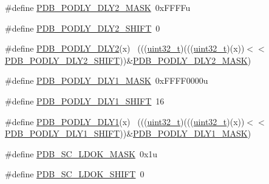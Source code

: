 \begin{DoxyCompactItemize}
\item 
\#define \hyperlink{group___p_d_b___register___masks_ga1b7c6a0b290ea82908b74e7b8c2f4009}{P\+D\+B\+\_\+\+P\+O\+D\+L\+Y\+\_\+\+D\+L\+Y2\+\_\+\+M\+A\+SK}~0x\+F\+F\+F\+Fu
\item 
\#define \hyperlink{group___p_d_b___register___masks_gaa576ed647be6411616c3f6e6d03ab47c}{P\+D\+B\+\_\+\+P\+O\+D\+L\+Y\+\_\+\+D\+L\+Y2\+\_\+\+S\+H\+I\+FT}~0
\item 
\#define \hyperlink{group___p_d_b___register___masks_gacb978b29977f07b658a43d8591505f74}{P\+D\+B\+\_\+\+P\+O\+D\+L\+Y\+\_\+\+D\+L\+Y2}(x)                                            ~(((\hyperlink{_p_e___types_8h_a33594304e786b158f3fb30289278f5af}{uint32\+\_\+t})(((\hyperlink{_p_e___types_8h_a33594304e786b158f3fb30289278f5af}{uint32\+\_\+t})(x))$<$$<$\hyperlink{group___p_d_b___register___masks_gaa576ed647be6411616c3f6e6d03ab47c}{P\+D\+B\+\_\+\+P\+O\+D\+L\+Y\+\_\+\+D\+L\+Y2\+\_\+\+S\+H\+I\+FT}))\&\hyperlink{group___p_d_b___register___masks_ga1b7c6a0b290ea82908b74e7b8c2f4009}{P\+D\+B\+\_\+\+P\+O\+D\+L\+Y\+\_\+\+D\+L\+Y2\+\_\+\+M\+A\+SK})
\item 
\#define \hyperlink{group___p_d_b___register___masks_ga548246bef07975bd6f1fe0fe5a2c6ef5}{P\+D\+B\+\_\+\+P\+O\+D\+L\+Y\+\_\+\+D\+L\+Y1\+\_\+\+M\+A\+SK}~0x\+F\+F\+F\+F0000u
\item 
\#define \hyperlink{group___p_d_b___register___masks_ga0890f882369124f86428eea14c2eac88}{P\+D\+B\+\_\+\+P\+O\+D\+L\+Y\+\_\+\+D\+L\+Y1\+\_\+\+S\+H\+I\+FT}~16
\item 
\#define \hyperlink{group___p_d_b___register___masks_ga5fe71745774ba14545ef51561393fb3b}{P\+D\+B\+\_\+\+P\+O\+D\+L\+Y\+\_\+\+D\+L\+Y1}(x)                                            ~(((\hyperlink{_p_e___types_8h_a33594304e786b158f3fb30289278f5af}{uint32\+\_\+t})(((\hyperlink{_p_e___types_8h_a33594304e786b158f3fb30289278f5af}{uint32\+\_\+t})(x))$<$$<$\hyperlink{group___p_d_b___register___masks_ga0890f882369124f86428eea14c2eac88}{P\+D\+B\+\_\+\+P\+O\+D\+L\+Y\+\_\+\+D\+L\+Y1\+\_\+\+S\+H\+I\+FT}))\&\hyperlink{group___p_d_b___register___masks_ga548246bef07975bd6f1fe0fe5a2c6ef5}{P\+D\+B\+\_\+\+P\+O\+D\+L\+Y\+\_\+\+D\+L\+Y1\+\_\+\+M\+A\+SK})
\item 
\#define \hyperlink{group___p_d_b___register___masks_gabe6a0c2a0e00e0d01b3b94ca8cd90728}{P\+D\+B\+\_\+\+S\+C\+\_\+\+L\+D\+O\+K\+\_\+\+M\+A\+SK}~0x1u
\item 
\#define \hyperlink{group___p_d_b___register___masks_ga8766bd357685d2ec463f51e0b08c6080}{P\+D\+B\+\_\+\+S\+C\+\_\+\+L\+D\+O\+K\+\_\+\+S\+H\+I\+FT}~0

\end{DoxyCompactItemize}
